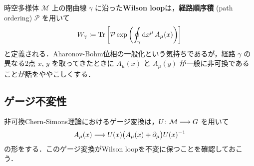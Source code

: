 \documentclass[TQFT_main]{subfiles}
\begin{document}
時空多様体 $\mathcal{M}$ 上の閉曲線 $\gamma$ に沿った\textbf{Wilson loop}は，\textbf{経路順序積} (path ordering) $\mathcal{P}$ を用いて
\begin{align}
    W_\gamma \coloneqq \Tr \left[ \mathcal{P} \exp \left( \oint_\gamma \dd{x}^\mu A_\mu (x) \right)  \right] 
\end{align}
と定義される．Aharonov-Bohm位相の一般化という気持ちであるが，経路 $\gamma$ の異なる2点 $x,\, y$ を取ってきたときに $A_\mu (x)$ と $A_\mu (y)$ が一般に非可換であることが話をややこしくする．
\subsection{ゲージ不変性}

非可換Chern-Simons理論におけるゲージ変換は，$U \colon \mathcal{M} \longrightarrow G$ を用いて
\begin{align}
    \label{eq:gauge-transform}
    A_\mu(x) \longrightarrow U(x) \bigl(A_\mu(x) + \partial_\mu\bigr) U(x)^{-1}
\end{align}
の形をする．このゲージ変換がWilson loopを不変に保つことを確認しておこう．
\end{document}
